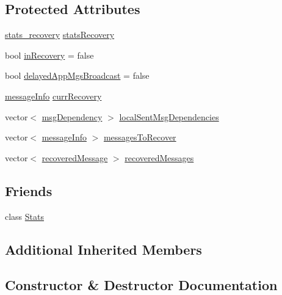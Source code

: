 \subsection*{Protected Attributes}
\begin{DoxyCompactItemize}
\item 
\hyperlink{_node_with_recovery_8h_a8724f9aa35500c4029d1757428ade746}{stats\+\_\+recovery} \hyperlink{class_node_with_recovery_abaecd0d1b36ad0305c281905a3465dd6}{stats\+Recovery}
\item 
bool \hyperlink{class_node_with_recovery_a4e8a29d0f69da296e9971bb5d8882cfb}{in\+Recovery} = false
\item 
bool \hyperlink{class_node_with_recovery_aae44e6b605047932d21cd5be25671963}{delayed\+App\+Mgs\+Broadcast} = false
\item 
\hyperlink{structures_8h_a7e7bdc1d2fff8a9436f2f352b2711ed6}{message\+Info} \hyperlink{class_node_with_recovery_a2e574321bd92cb51ef3346168057fe0f}{curr\+Recovery}
\item 
vector$<$ \hyperlink{_node_with_recovery_8h_a7a7c744666781dbc85c00bb4ccb4a60f}{msg\+Dependency} $>$ \hyperlink{class_node_with_recovery_a6b143ca2c401bbb2689443091d4d7e17}{local\+Sent\+Msg\+Dependencies}
\item 
vector$<$ \hyperlink{structures_8h_a7e7bdc1d2fff8a9436f2f352b2711ed6}{message\+Info} $>$ \hyperlink{class_node_with_recovery_a9ed4ac06c68ac579d7848a98b145b5ae}{messages\+To\+Recover}
\item 
vector$<$ \hyperlink{_node_with_recovery_8h_abc64f7ff8d329883ae93979292b1c996}{recovered\+Message} $>$ \hyperlink{class_node_with_recovery_adf6b319a727cd9ec43a6cc68cbf99bbb}{recovered\+Messages}
\end{DoxyCompactItemize}
\subsection*{Friends}
\begin{DoxyCompactItemize}
\item 
class \hyperlink{class_node_with_recovery_a129f65b6976377739eb6231b6962985e}{Stats}
\end{DoxyCompactItemize}
\subsection*{Additional Inherited Members}


\subsection{Constructor \& Destructor Documentation}
\mbox{\label{class_node_with_recovery_aed1d9b2cfa7729902c90c103ab3075ff}} 
